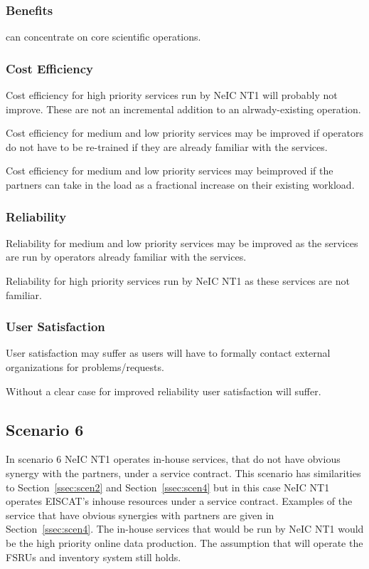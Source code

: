 \documentclass[12pt,a4paper]{article}
\newcommand{\nnt}{NeIC NT1\xspace}
\begin{document}
\subsubsection*{Benefits}
\bitm
\item \EC can concentrate on core scientific operations.
\eitm

\subsubsection*{Cost Efficiency}
\bitm
\item Cost efficiency for high priority services run by \nnt will probably not improve.
  These are not an incremental addition to an alrwady-existing operation.
  \item Cost efficiency for medium and low priority services may be improved if operators do not have to be re-trained if they are already familiar with the services.
  \item Cost efficiency for medium and low priority services may beimproved if the partners can take in the \ED load as a fractional increase on their existing workload.
\eitm

\subsubsection*{Reliability}
\bitm
  \item Reliability for medium and low priority services may be improved as the services are run by operators already familiar with the services.
  \item Reliability for high priority services run by \nnt as these services are not familiar.
\eitm

\subsubsection*{User Satisfaction}
\bitm
\item User satisfaction may suffer as \EC users will have to formally contact external organizations for problems/requests.
  \item Without a clear case for improved reliability user satisfaction will suffer.
\eitm

\subsection{Scenario 6}
\label{ssec:scen6}

In scenario 6 \nnt operates  in-house services, that do not have obvious synergy with the \EC partners,
under a service contract.
This scenario has similarities to Section~\ref{ssec:scen2} and Section~\ref{ssec:scen4} but
in this case \nnt operates EISCAT's inhouse resources under a service contract.
Examples of the \ED service that have obvious synergies with partners are given in Section~\ref{ssec:scen4}.
The in-house \ED services that would be run by \nnt would be the high priority online data production.
The assumption that \EC will operate the FSRUs and inventory system still holds.
\end{document}
